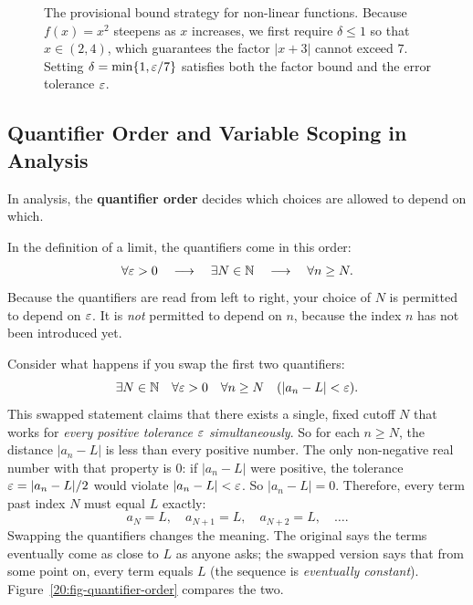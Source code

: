\begin{figure}[htbp]
\caption{The provisional bound strategy for non-linear functions. Because $f(x) = x^2$ steepens as $x$ increases, we first require $\delta \le 1$ so that $x \in (2, 4)$, which guarantees the factor $|x+3|$ cannot exceed $7$. Setting $\delta = \min\{1, \varepsilon/7\}$ satisfies both the factor bound and the error tolerance $\varepsilon$.}\label{20:fig-nonlinear-provisional}
\end{figure}

\subsection{Quantifier Order and Variable Scoping in Analysis}

In analysis, the \textbf{quantifier order} decides which choices are allowed to depend on which.

In the definition of a limit, the quantifiers come in this order:
\[
\forall \varepsilon > 0 \quad \longrightarrow \quad \exists N \in \mathbb{N} \quad \longrightarrow \quad \forall n \ge N.
\]
Because the quantifiers are read from left to right, your choice of $N$ is permitted to depend on $\varepsilon$. It is \emph{not} permitted to depend on $n$, because the index $n$ has not been introduced yet.

Consider what happens if you swap the first two quantifiers:
\[
\exists N \in \mathbb{N} \quad \forall \varepsilon > 0 \quad \forall n \ge N \quad (|a_n - L| < \varepsilon).
\]
This swapped statement claims that there exists a single, fixed cutoff $N$ that works for \emph{every positive tolerance $\varepsilon$ simultaneously}. So for each $n \ge N$, the distance $|a_n - L|$ is less than every positive number. The only non-negative real number with that property is $0$: if $|a_n - L|$ were positive, the tolerance $\varepsilon = |a_n - L|/2$ would violate $|a_n - L| < \varepsilon$. So $|a_n - L| = 0$. Therefore, every term past index $N$ must equal $L$ exactly:
\[
a_N = L, \quad a_{N+1} = L, \quad a_{N+2} = L, \quad \dots.
\]
Swapping the quantifiers changes the meaning. The original says the terms eventually come as close to $L$ as anyone asks; the swapped version says that from some point on, every term equals $L$ (the sequence is \emph{eventually constant}). Figure~\ref{20:fig-quantifier-order} compares the two.

